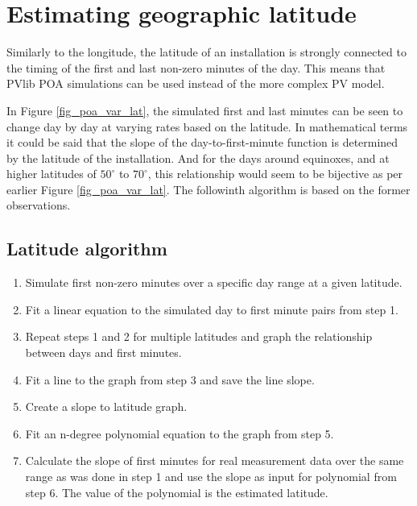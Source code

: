 
\newpage 
\section{Estimating geographic latitude}
Similarly to the longitude, the latitude of an installation is strongly connected to the timing of the first and last non-zero minutes of the day. This means that PVlib POA simulations can be used instead of the more complex PV model.

In Figure \ref{fig_poa_var_lat}, the simulated first and last minutes can be seen to change day by day at varying rates based on the latitude. In mathematical terms it could be said that the slope of the day-to-first-minute function is determined by the latitude of the installation. And for the days around equinoxes, and at higher latitudes of $50^\circ$ to $70^\circ$, this relationship would seem to be bijective as per earlier Figure \ref{fig_poa_var_lat}. The followinth algorithm is based on the former observations.


\hfill


\subsection{Latitude algorithm}
\begin{enumerate}
  \item Simulate first non-zero minutes over a specific day range at a given latitude.
  
  \item Fit a linear equation to the simulated day to first minute pairs from step 1.
  
  \item Repeat steps 1 and 2 for multiple latitudes and graph the relationship between days and first minutes.
  
  \item Fit a line to the graph from step 3 and save the line slope.
  
  \item Create a slope to latitude graph.
  
  \item Fit an n-degree polynomial equation to the graph from step 5.
  
  \item Calculate the slope of first minutes for real measurement data over the same range as was done in step 1 and use the slope as input for polynomial from step 6. The value of the polynomial is the estimated latitude.
  
\end{enumerate}

